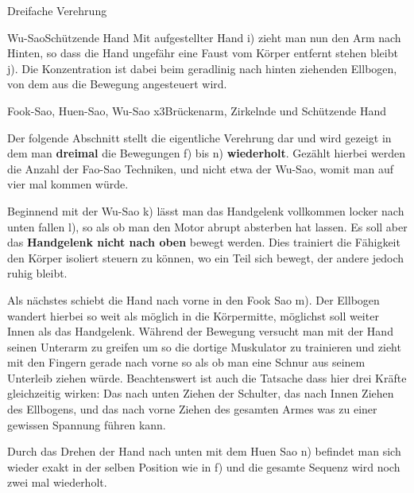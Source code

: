\begin{WTSatz}{Dreifache Verehrung}
\begin{WTSatzTeil}{Wu-Sao}{Sch\"utzende Hand}
		Mit aufgestellter Hand i) zieht man nun den Arm nach Hinten, so dass die Hand ungef\"ahr eine Faust vom K\"orper entfernt stehen bleibt j). Die Konzentration ist dabei beim geradlinig nach hinten ziehenden Ellbogen, von dem aus die Bewegung angesteuert wird.
		
	\end{WTSatzTeil}
	\begin{WTSatzTeil}{Fook-Sao, Huen-Sao, Wu-Sao x3}{Br\"uckenarm, Zirkelnde und Sch\"utzende Hand}
		
		Der folgende Abschnitt stellt die eigentliche Verehrung dar und wird gezeigt in dem man \textbf{dreimal} die Bewegungen f) bis n) \textbf{wiederholt}. Gez\"ahlt hierbei werden die Anzahl der Fao-Sao Techniken, und nicht etwa der Wu-Sao, womit man auf vier mal kommen w\"urde.

		
		Beginnend mit der Wu-Sao k) l\"asst man das Handgelenk vollkommen locker nach unten fallen l), so als ob man den Motor abrupt absterben hat lassen\label{LBL_motorabsterben}. Es soll aber das \textbf{Handgelenk nicht nach oben} bewegt werden. Dies trainiert die F\"ahigkeit den K\"orper isoliert steuern zu k\"onnen, wo ein Teil sich bewegt, der andere jedoch ruhig bleibt.

		Als n\"achstes schiebt die Hand nach vorne in den Fook Sao m). Der Ellbogen wandert hierbei so weit als m\"oglich in die K\"orpermitte, m\"oglichst soll weiter Innen als das Handgelenk. W\"ahrend der Bewegung versucht man mit der Hand seinen Unterarm zu greifen um so die dortige Muskulator zu trainieren und zieht mit den Fingern gerade nach vorne so als ob man eine Schnur aus seinem Unterleib ziehen w\"urde. Beachtenswert ist auch die Tatsache dass hier drei Kr\"afte gleichzeitig wirken: Das nach unten Ziehen der Schulter, das nach Innen Ziehen des Ellbogens, und das nach vorne Ziehen des gesamten Armes was zu einer gewissen Spannung f\"uhren kann.


		Durch das Drehen der Hand nach unten mit dem Huen Sao n) befindet man sich wieder exakt in der selben Position wie in f) und die gesamte Sequenz wird noch zwei mal wiederholt.
		

\end{WTSatzTeil}
\end{WTSatz}
